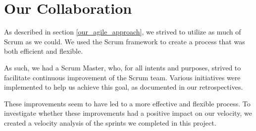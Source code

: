 \section{Our Collaboration}
As described in section \ref{our_agile_approach}, we strived to utilize as much of Scrum as we could. We used the Scrum framework to create a process that was both efficient and flexible. 

As such, we had a Scrum Master, who, for all intents and purposes, strived to facilitate continuous improvement of the Scrum team. Various initiatives were implemented to help us achieve this goal, as documented in our retrospectives.

These improvements seem to have led to a more effective and flexible process. To investigate whether these improvements had a positive impact on our velocity, we created a velocity analysis of the sprints we completed in this project.

